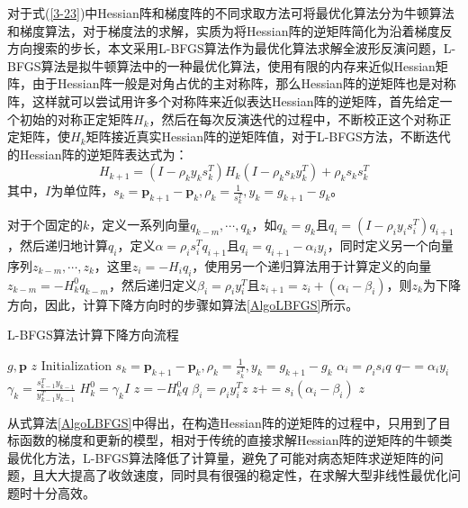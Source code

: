 \documentclass[12pt]{article}
\renewcommand{\algorithmicrequire}{\textbf{参数说明:}}
\renewcommand{\algorithmicensure}{\textbf{输出:}}
\begin{document}
\par
对于式(\ref{3-23})中Hessian阵和梯度阵的不同求取方法可将最优化算法分为牛顿算法和梯度算法，对于梯度法的求解，实质为将Hessian阵的逆矩阵简化为沿着梯度反方向搜索的步长，本文采用L-BFGS算法作为最优化算法求解全波形反演问题，L-BFGS算法是拟牛顿算法中的一种最优化算法，使用有限的内存来近似Hessian矩阵，由于Hessian阵一般是对角占优的主对称阵，那么Hessian阵的逆矩阵也是对称阵，这样就可以尝试用许多个对称阵来近似表达Hessian阵的逆矩阵，首先给定一个初始的对称正定矩阵$H_k$，然后在每次反演迭代的过程中，不断校正这个对称正定矩阵，使$H_k$矩阵接近真实Hessian阵的逆矩阵值，对于L-BFGS方法，不断迭代的Hessian阵的逆矩阵表达式为：
\begin{equation}\label{3-24}
H_{k+1}=(I-\rho_k y_k s_k^T)H_k(I-\rho_k s_k y_k^T)+\rho_k s_k s_k^T
\end{equation}
其中，$I$为单位阵，$s_k=\boldsymbol{p}_{k+1}-\boldsymbol{p}_k,\rho_k=\frac{1}{s_k^T},y_k=g_{k+1}-g_k$。
\par
对于个固定的$k$，定义一系列向量$q_{k-m},\cdots,q_k$，如$q_k=g_k$且$q_i=(I-\rho_i y_i s_i^T)q_{i+1}$，然后递归地计算$q_i$，定义$\alpha=\rho_i s_i^T q_{i+1}$且$q_i=q_{i+1}-\alpha_i y_i$，同时定义另一个向量序列$z_{k-m},\cdots,z_k$，这里$z_i=-H_i q_i$，使用另一个递归算法用于计算定义的向量$z_{k-m}=-H_k^0 q_{k-m}$，然后递归定义$\beta_i=\rho_i y_i^T$且$z_{i+1}=z_i+(\alpha_i-\beta_i)$，则$z_k$为下降方向，因此，计算下降方向时的步骤如算法\ref{AlgoLBFGS}所示。
\begin{algorithm}[H]
\caption{L-BFGS算法计算下降方向流程}
\label{AlgoLBFGS}
\renewcommand{\algorithmicrequire}{\textbf{输入:}}
\renewcommand{\algorithmicensure}{\textbf{输出:}}
\begin{algorithmic}[1]
\Require
$g,\boldsymbol{p}$
\Ensure
$z$
\State Initialization $s_k=\boldsymbol{p}_{k+1}-\boldsymbol{p}_k,\rho_k=\frac{1}{s_k^T},y_k=g_{k+1}-g_k$
\State $\alpha_i=\rho_i s_i q$
\State $q-=\alpha_i y_i$
\EndFor
\State $\gamma_k=\frac{s_{k-1}^T y_{k-1}}{y_{k-1}^T y_{k-1}}$
\State $H_k^0=\gamma_k I$
\State $z=-H_k^0 q$
\State $\beta_i=\rho_i y_i^T z$
\State $z+=s_i(\alpha_i-\beta_i)$
\EndFor
\State \Return $z$
\end{algorithmic}
\end{algorithm}
从式算法\ref{AlgoLBFGS}中得出，在构造Hessian阵的逆矩阵的过程中，只用到了目标函数的梯度和更新的模型，相对于传统的直接求解Hessian阵的逆矩阵的牛顿类最优化方法，L-BFGS算法降低了计算量，避免了可能对病态矩阵求逆矩阵的问题，且大大提高了收敛速度，同时具有很强的稳定性，在求解大型非线性最优化问题时十分高效。
\end{document}
